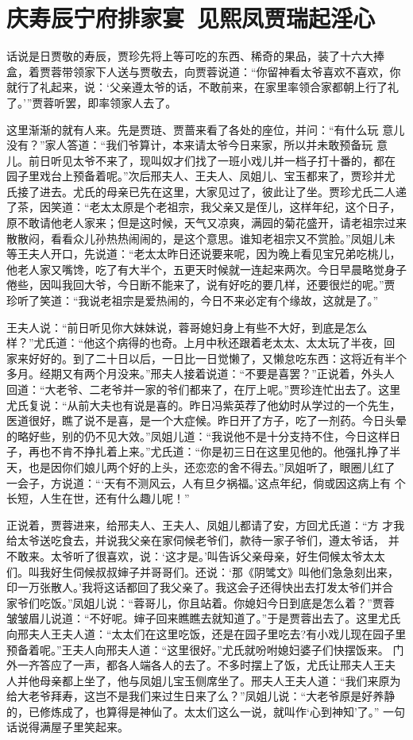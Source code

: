 \chapter{庆寿辰宁府排家宴~见熙凤贾瑞起淫心}

话说是日贾敬的寿辰，贾珍先将上等可吃的东西、稀奇的果品，装了十六大捧
盒，着贾蓉带领家下人送与贾敬去，向贾蓉说道：“你留神看太爷喜欢不喜欢，你
就行了礼起来，说：‘父亲遵太爷的话，不敢前来，在家里率领合家都朝上行了礼
了。’”贾蓉听罢，即率领家人去了。

这里渐渐的就有人来。先是贾琏、贾蔷来看了各处的座位，并问：“有什么玩
意儿没有？”家人答道：“我们爷算计，本来请太爷今日来家，所以并未敢预备玩
意儿。前日听见太爷不来了，现叫奴才们找了一班小戏儿并一档子打十番的，都在
园子里戏台上预备着呢。”次后邢夫人、王夫人、凤姐儿、宝玉都来了，贾珍并尤
氏接了进去。尤氏的母亲已先在这里，大家见过了，彼此让了坐。贾珍尤氏二人递
了茶，因笑道：“老太太原是个老祖宗，我父亲又是侄儿，这样年纪，这个日子，
原不敢请他老人家来；但是这时候，天气又凉爽，满园的菊花盛开，请老祖宗过来
散散闷，看看众儿孙热热闹闹的，是这个意思。谁知老祖宗又不赏脸。”凤姐儿未
等王夫人开口，先说道：“老太太昨日还说要来呢，因为晚上看见宝兄弟吃桃儿，
他老人家又嘴馋，吃了有大半个，五更天时候就一连起来两次。今日早晨略觉身子
倦些，因叫我回大爷，今日断不能来了，说有好吃的要几样，还要很烂的呢。”贾
珍听了笑道：“我说老祖宗是爱热闹的，今日不来必定有个缘故，这就是了。”

王夫人说：“前日听见你大妹妹说，蓉哥媳妇身上有些不大好，到底是怎么
样？”尤氏道：“他这个病得的也奇。上月中秋还跟着老太太、太太玩了半夜，回
家来好好的。到了二十日以后，一日比一日觉懒了，又懒怠吃东西：这将近有半个
多月。经期又有两个月没来。”邢夫人接着说道：“不要是喜罢？”正说着，外头人
回道：“大老爷、二老爷并一家的爷们都来了，在厅上呢。”贾珍连忙出去了。这里
尤氏复说：“从前大夫也有说是喜的。昨日冯紫英荐了他幼时从学过的一个先生，
医道很好，瞧了说不是喜，是一个大症候。昨日开了方子，吃了一剂药。今日头晕
的略好些，别的仍不见大效。”凤姐儿道：“我说他不是十分支持不住，今日这样日
子，再也不肯不挣扎着上来。”尤氏道：“你是初三日在这里见他的。他强扎挣了半
天，也是因你们娘儿两个好的上头，还恋恋的舍不得去。”凤姐听了，眼圈儿红了
一会子，方说道：“‘天有不测风云，人有旦夕祸福。’这点年纪，倘或因这病上有
个长短，人生在世，还有什么趣儿呢！”

正说着，贾蓉进来，给邢夫人、王夫人、凤姐儿都请了安，方回尤氏道：“方
才我给太爷送吃食去，并说我父亲在家伺候老爷们，款待一家子爷们，遵太爷话，
并不敢来。太爷听了很喜欢，说：‘这才是。’叫告诉父亲母亲，好生伺候太爷太太
们。叫我好生伺候叔叔婶子并哥哥们。还说：‘那《阴骘文》叫他们急急刻出来，
印一万张散人。’我将这话都回了我父亲了。我这会子还得快出去打发太爷们并合
家爷们吃饭。”凤姐儿说：“蓉哥儿，你且站着。你媳妇今日到底是怎么着？”贾蓉
皱皱眉儿说道：“不好呢。婶子回来瞧瞧去就知道了。”于是贾蓉出去了。这里尤氏
向邢夫人王夫人道：“太太们在这里吃饭，还是在园子里吃去?有小戏儿现在园子里
预备着呢。”王夫人向邢夫人道：“这里很好。”尤氏就吩咐媳妇婆子们快摆饭来。
门外一齐答应了一声，都各人端各人的去了。不多时摆上了饭，尤氏让邢夫人王夫
人并他母亲都上坐了，他与凤姐儿宝玉侧席坐了。邢夫人王夫人道：“我们来原为
给大老爷拜寿，这岂不是我们来过生日来了么？”凤姐儿说：“大老爷原是好养静
的，已修炼成了，也算得是神仙了。太太们这么一说，就叫作‘心到神知’了。”
一句话说得满屋子里笑起来。

